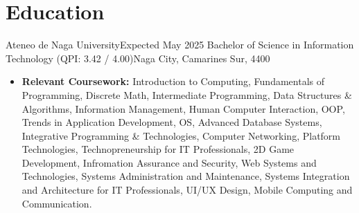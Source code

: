 \section{Education}

\resumeSubHeadingListStart
    \resumeSubheading
    {Ateneo de Naga University}{Expected May 2025}
    {Bachelor of Science in Information Technology (QPI: 3.42 / 4.00)}{Naga City, Camarines Sur, 4400}
    \begin{itemize}
        \item \textbf{Relevant Coursework:} Introduction to Computing, Fundamentals of Programming, Discrete Math, Intermediate Programming, Data Structures \& Algorithms, Information Management, Human Computer Interaction, OOP, Trends in Application Development, OS, Advanced Database Systems, Integrative Programming \& Technologies, Computer Networking, Platform Technologies, Technopreneurship for IT Professionals, 2D Game Development, Infromation Assurance and Security, Web Systems and Technologies, Systems Administration and Maintenance, Systems Integration and Architecture for IT Professionals, UI/UX Design, Mobile Computing and Communication.
    \end{itemize}
\resumeSubHeadingListEnd
